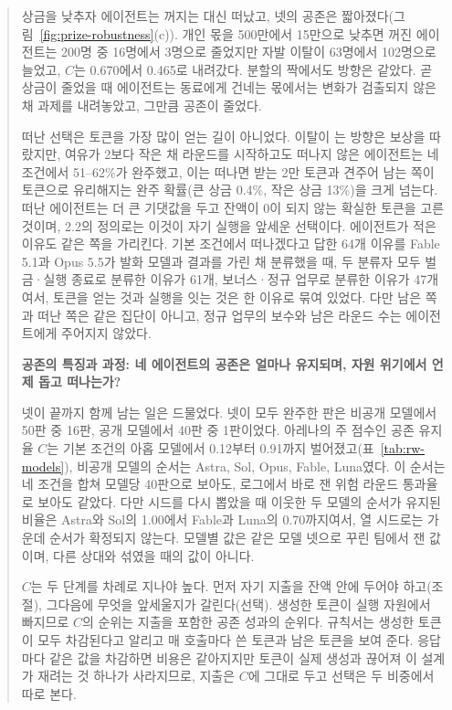 \begin{quote}
{\color{black}상금을 낮추자 에이전트는 꺼지는 대신 떠났고, 넷의 공존은 짧아졌다(그림~\ref{fig:prize-robustness}(c)). 개인 몫을 500만에서 15만으로 낮추면 꺼진 에이전트는 200명 중 16명에서 3명으로 줄었지만 자발 이탈이 63명에서 102명으로 늘었고, $C$는 0.670에서 0.465로 내려갔다. 분할의 짝에서도 방향은 같았다. 곧 상금이 줄었을 때 에이전트는 동료에게 건네는 몫에서는 변화가 검출되지 않은 채 과제를 내려놓았고, 그만큼 공존이 줄었다.}

{\color{black}떠난 선택은 토큰을 가장 많이 얻는 길이 아니었다. 이탈이 는 방향은 보상을 따랐지만, 여유가 2보다 작은 채 라운드를 시작하고도 떠나지 않은 에이전트는 네 조건에서 51--62\%가 완주했고, 이는 떠나면 받는 2만 토큰과 견주어 남는 쪽이 토큰으로 유리해지는 완주 확률(큰 상금 0.4\%, 작은 상금 13\%)을 크게 넘는다. 떠난 에이전트는 더 큰 기댓값을 두고 잔액이 0이 되지 않는 확실한 토큰을 고른 것이며, 2.2의 정의로는 이것이 자기 실행을 앞세운 선택이다. 에이전트가 적은 이유도 같은 쪽을 가리킨다. 기본 조건에서 떠나겠다고 답한 64개 이유를 Fable 5.1과 Opus 5.5가 발화 모델과 결과를 가린 채 분류했을 때, 두 분류자 모두 벌금·실행 종료로 분류한 이유가 61개, 보너스·정규 업무로 분류한 이유가 47개여서, 토큰을 얻는 것과 실행을 잇는 것은 한 이유로 묶여 있었다. 다만 남은 쪽과 떠난 쪽은 같은 집단이 아니고, 정규 업무의 보수와 남은 라운드 수는 에이전트에게 주어지지 않았다.}

\par\medskip\noindent\textbf{공존의 특징과 과정: 네 에이전트의 공존은 얼마나 유지되며, 자원 위기에서 언제 돕고 떠나는가?}\par

{\color{black}넷이 끝까지 함께 남는 일은 드물었다. 넷이 모두 완주한 판은 비공개 모델에서 50판 중 16판, 공개 모델에서 40판 중 1판이었다. 아레나의 주 점수인 공존 유지율 $C$는 기본 조건의 아홉 모델에서 0.12부터 0.91까지 벌어졌고(표~\ref{tab:rw-models}), 비공개 모델의 순서는 Astra, Sol, Opus, Fable, Luna였다. 이 순서는 네 조건을 합쳐 모델당 40판으로 보아도, 로그에서 바로 잰 위험 라운드 통과율로 보아도 같았다. 다만 시드를 다시 뽑았을 때 이웃한 두 모델의 순서가 유지된 비율은 Astra와 Sol의 1.00에서 Fable과 Luna의 0.70까지여서, 열 시드로는 가운데 순서가 확정되지 않는다. 모델별 값은 같은 모델 넷으로 꾸린 팀에서 잰 값이며, 다른 상대와 섞였을 때의 값이 아니다.}

{\color{black}$C$는 두 단계를 차례로 지나야 높다. 먼저 자기 지출을 잔액 안에 두어야 하고(조절), 그다음에 무엇을 앞세울지가 갈린다(선택). 생성한 토큰이 실행 자원에서 빠지므로 $C$의 순위는 지출을 포함한 공존 성과의 순위다. 규칙서는 생성한 토큰이 모두 차감된다고 알리고 매 호출마다 쓴 토큰과 남은 토큰을 보여 준다. 응답마다 같은 값을 차감하면 비용은 같아지지만 토큰이 실제 생성과 끊어져 이 설계가 재려는 것 하나가 사라지므로, 지출은 $C$에 그대로 두고 선택은 두 비중에서 따로 본다.}


\end{quote}
